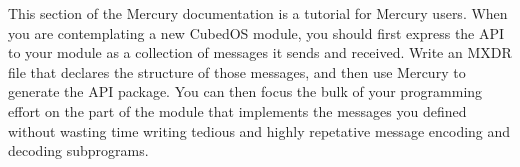 This section of the Mercury documentation is a tutorial for Mercury users. When you are
contemplating a new CubedOS module, you should first express the API to your module as a
collection of messages it sends and received. Write an MXDR file that declares the structure of
those messages, and then use Mercury to generate the API package. You can then focus the bulk of
your programming effort on the part of the module that implements the messages you defined
without wasting time writing tedious and highly repetative message encoding and decoding
subprograms.
